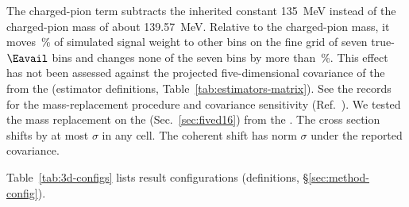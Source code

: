 The charged-pion term subtracts the inherited constant \SI{135}{MeV} instead of the charged-pion mass of about \SI{139.57}{MeV}. Relative to the charged-pion mass, it moves \,\% of simulated signal weight to other bins on the fine grid of seven true-$\Eavail$ bins and changes none of the seven bins by more than \,\%. This effect has not been assessed against the projected five-dimensional covariance of the \resFiveAxis{} from the \estPurity{} (estimator definitions, Table~\ref{tab:estimators-matrix}). See the records for the mass-replacement procedure and covariance sensitivity (Ref.~\cite{NoteRecords2026}). We tested the mass replacement on the \resSixteen{} (Sec.~\ref{sec:fived16}) from the \estMultiD{}. The cross section shifts by at most $\sigma$ in any cell. The coherent shift has norm $\sigma$ under the reported covariance.



Table~\ref{tab:3d-configs} lists result configurations (definitions, \S\ref{sec:method-config}).

